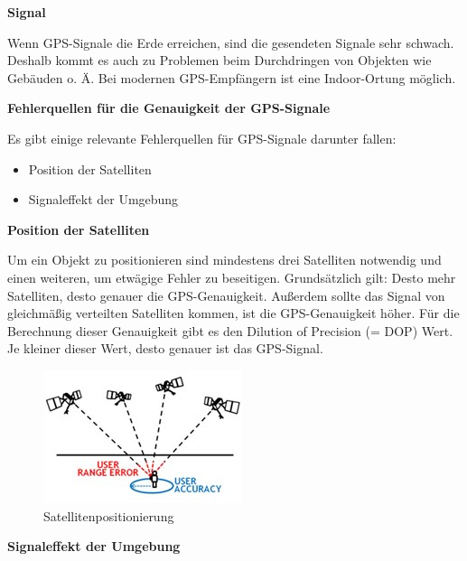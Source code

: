 \textbf{Signal}

Wenn GPS-Signale die Erde erreichen, sind die gesendeten Signale sehr schwach. Deshalb kommt es auch zu Problemen beim Durchdringen von Objekten wie Gebäuden o. Ä. Bei modernen GPS-Empfängern ist eine Indoor-Ortung möglich.

\textbf{Fehlerquellen für die Genauigkeit der GPS-Signale}

Es gibt einige relevante Fehlerquellen für GPS-Signale darunter fallen:
\begin{itemize}
	\item Position der Satelliten
	\item Signaleffekt der Umgebung
\end{itemize}

\textbf{Position der Satelliten}

Um ein Objekt zu positionieren sind mindestens drei Satelliten notwendig und einen weiteren, um etwägige Fehler zu beseitigen. Grundsätzlich gilt: Desto mehr Satelliten, desto genauer die GPS-Genauigkeit. Außerdem sollte das Signal von gleichmäßig verteilten Satelliten kommen, ist die GPS-Genauigkeit höher. Für die Berechnung dieser Genauigkeit gibt es den Dilution of Precision (= DOP) Wert.  Je kleiner dieser Wert, desto genauer ist das GPS-Signal.
\begin{figure}[H]
	\centering
	\includegraphics[width=0.7\linewidth]{images/Satellitenposition.jpg}
	\caption[Satellitenpositionierung]{Satellitenpositionierung}
	\label{fig:Satellitenposition}
\end{figure}

\textbf{Signaleffekt der Umgebung}


